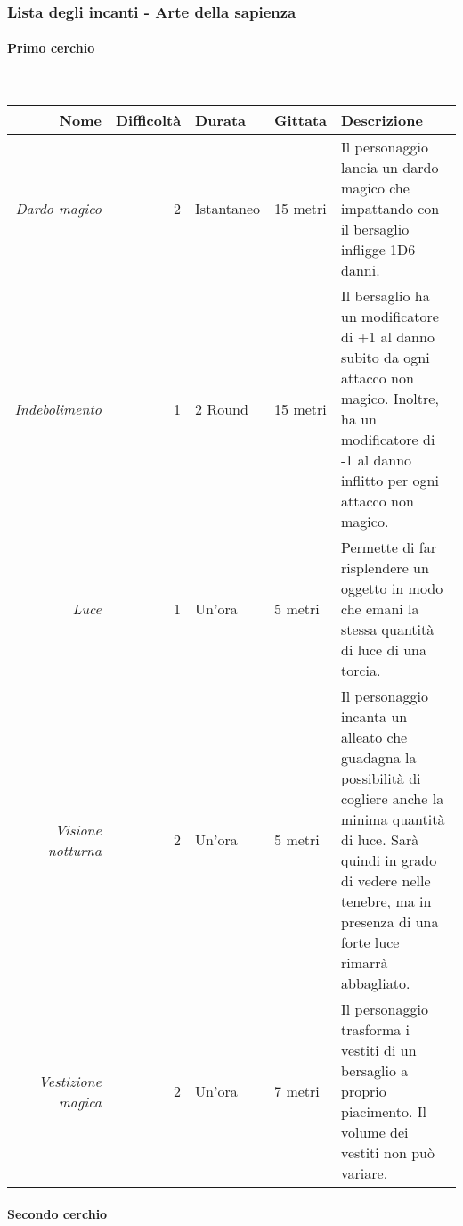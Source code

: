 \documentclass[../manuale_main.tex]{subfiles}
\begin{document}
\clearpage
\subsubsection{Lista degli incanti - Arte della sapienza}
\paragraph{Primo cerchio}\mbox{}\\

\begin{tabularx}{\linewidth}{|N| D| T| G| Y|}
\hline
\textbf{Nome} & \textbf{Difficoltà} & \textbf{Durata} & \textbf{Gittata} & \textbf{Descrizione} \\ \hline\hline
\textit{Dardo magico} & 2 & Istantaneo & 15 metri & Il personaggio lancia un dardo magico che impattando con il bersaglio infligge 1D6 danni. \\ \hline
\textit{Indebolimento} &1  &2 Round  & 15 metri  & Il bersaglio ha un modificatore di +1 al danno subito da ogni attacco non magico. Inoltre, ha un modificatore di -1 al danno inflitto per ogni attacco non magico.  \\ \hline
\textit{Luce} & 1 & Un'ora & 5 metri & Permette di far risplendere un oggetto in modo che emani la stessa quantità di luce di una torcia. \\ \hline
\textit{Visione notturna} &2  & Un'ora & 5 metri &  Il personaggio  incanta un alleato che guadagna la possibilità di cogliere anche la minima quantità di luce. Sarà quindi in grado di vedere nelle tenebre, ma in presenza di una forte luce rimarrà abbagliato.\\ \hline
\textit{Vestizione magica} & 2 & Un'ora & 7 metri & Il personaggio trasforma i vestiti di un bersaglio a proprio piacimento. Il volume dei vestiti non può variare.\\
\hline
\end{tabularx}
\clearpage
\paragraph{Secondo cerchio}\mbox{}\\
\end{document}

